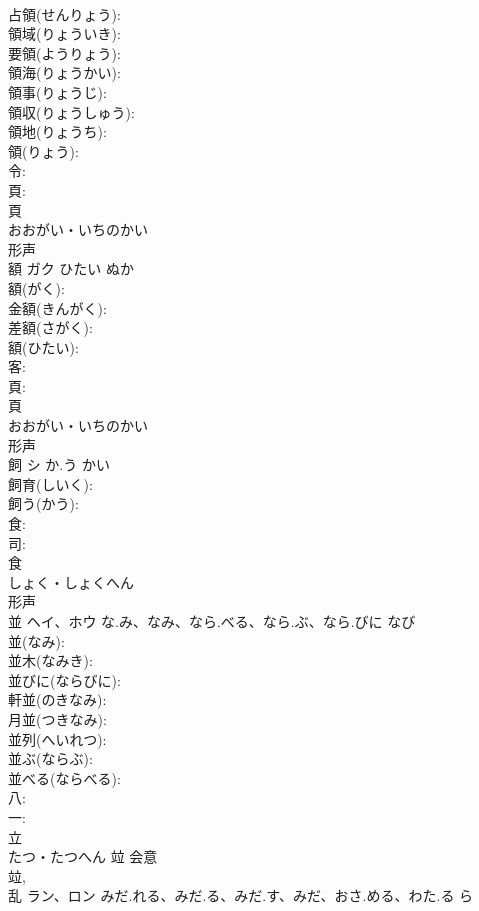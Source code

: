 \documentclass[8pt]{extreport}
\begin{document}
\begin{CJK}{UTF8}{min}
\\	占領(せんりょう): 
\\	領域(りょういき): 
\\	要領(ようりょう): 
\\	領海(りょうかい): 
\\	領事(りょうじ): 
\\	領収(りょうしゅう): 
\\	領地(りょうち): 
\\	領(りょう): 
\\	令: 
\\	頁: 
\\	頁	
\\	おおがい・いちのかい	
\\	形声 
\\	額	ガク	ひたい	ぬか	
\\	額(がく): 
\\	金額(きんがく): 
\\	差額(さがく): 
\\	額(ひたい): 
\\	客: 
\\	頁: 
\\	頁	
\\	おおがい・いちのかい	
\\	形声 
\\	飼	シ	か.う	かい	
\\	飼育(しいく): 
\\	飼う(かう): 
\\	食: 
\\	司: 
\\	食	
\\	しょく・しょくへん	
\\	形声 
\\	並	ヘイ、ホウ	な.み、なみ、なら.べる、なら.ぶ、なら.びに	なび	
\\	並(なみ): 
\\	並木(なみき): 
\\	並びに(ならびに): 
\\	軒並(のきなみ): 
\\	月並(つきなみ): 
\\	並列(へいれつ): 
\\	並ぶ(ならぶ): 
\\	並べる(ならべる): 
\\	八: 
\\	一: 
\\	立	
\\	たつ・たつへん	竝	会意 
\\	竝, 
\\	乱	ラン、ロン	みだ.れる、みだ.る、みだ.す、みだ、おさ.める、わた.る	ら	

\end{CJK}
\end{document}
